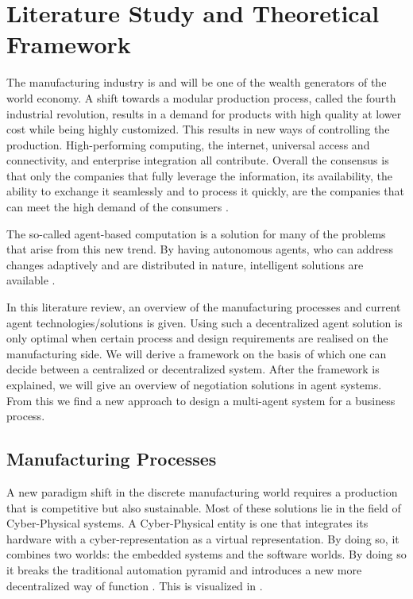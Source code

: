 \chapter{Literature Study and Theoretical Framework}
\label{ch:literature}
The manufacturing industry is and will be one of the wealth generators of the world economy. A shift towards a modular production process, called the fourth industrial revolution, results in a demand for products with high quality at lower cost while being highly customized. This results in new ways of controlling the production. High-performing computing, the internet, universal access and connectivity, and enterprise integration all contribute. Overall the consensus is that only the companies that fully leverage the information, its availability, the ability to exchange it seamlessly and to process it quickly, are the companies that can meet the high demand of the consumers \citep{monostori2006agent}.

The so-called agent-based computation is a solution for many of the problems that arise from this new trend. By having autonomous agents, who can address changes adaptively and are distributed in nature, intelligent solutions are available \citep{monostori2006agent}.

In this literature review, an overview of the manufacturing processes and current agent technologies/solutions is given. Using such a decentralized agent solution is only optimal when certain process and design requirements are realised on the manufacturing side. We will derive a framework  on the basis of which one can decide between a centralized or decentralized system. After the framework is explained, we will give an overview of negotiation solutions in agent systems. From this we find a new approach to design a multi-agent system for a business process.

\section{Manufacturing Processes}

A new paradigm shift in the discrete manufacturing world requires a production that is competitive but also sustainable. Most of these solutions lie in the field of Cyber-Physical systems. A Cyber-Physical entity is one that integrates its hardware with a cyber-representation as a virtual representation. By doing so, it combines two worlds: the embedded systems and the software worlds. By doing so it breaks the traditional automation pyramid and introduces a new more decentralized way of function \citep{leitao2016smart}. This is visualized in . %
	
